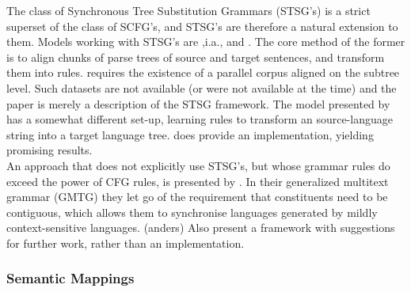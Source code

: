 \documentclass{report}
\theoremstyle{definition}
\theoremstyle{plain}
\begin{document}
The class of Synchronous Tree Substitution Grammars (STSG's) is a strict superset of the class of SCFG's, and STSG's are therefore a natural extension to them. Models working with STSG's are ,i.a., \cite{poutsma2000data} and \cite{galley2004s,galley2006scalable}. The core method of the former is to align chunks of parse trees of source and target sentences, and transform them into rules. \cite{poutsma2000data} requires the existence of a parallel corpus aligned on the subtree level. Such datasets are not available (or were not available at the time) and the paper is merely a description of the STSG framework.  The model presented by \citeauthor{galley2004s} has a somewhat different set-up, learning rules to transform an source-language string into a target language tree. \cite{galley2006scalable} does provide an implementation, yielding promising results.\\
An approach that does not explicitly use STSG's, but whose grammar rules do exceed the power of CFG rules, is presented by \cite{melamed2004generalized}. In their generalized multitext grammar (GMTG) they let go of the requirement that constituents need to be contiguous, which allows them to synchronise languages generated by mildly context-sensitive languages. (anders) Also \citeauthor{melamed2004generalized} present a framework with suggestions for further work, rather than an implementation.


\subsubsection{Semantic Mappings}
\end{document}
